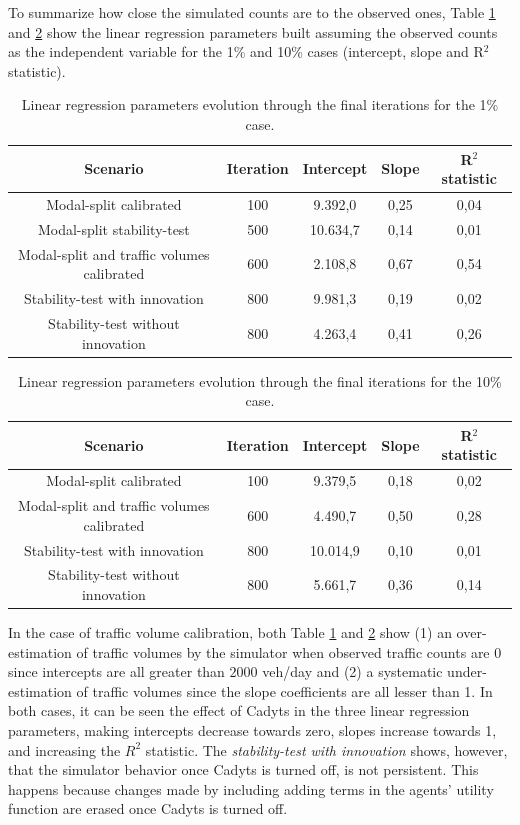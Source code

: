 \documentclass[Journal,letterpaper]{ascelike-new}
\begin{document}
To summarize how close the simulated counts are to the observed ones, Table \ref{table:1pct_fitEvolution} and \ref{table:10pct_fitEvolution} show the linear regression parameters built assuming the observed counts as the independent variable for the 1\% and 10\% cases (intercept, slope and R$^2$ statistic).

\begin{table}
	\caption{Linear regression parameters evolution through the final iterations for the 1\% case.}
	\label{table:1pct_fitEvolution}
	\begin{tabular}{ccccc}
		\hline	
		Scenario & Iteration & Intercept &  Slope & R$^{2}$ statistic \\
		\hline
		Modal-split calibrated						& 100 & 9.392,0  & 0,25 & 0,04 \\
		Modal-split stability-test					& 500 & 10.634,7 & 0,14 & 0,01 \\
		Modal-split and traffic volumes calibrated	& 600 & 2.108,8  & 0,67 & 0,54 \\
		Stability-test with innovation				& 800 & 9.981,3  & 0,19 & 0,02 \\
		Stability-test without innovation			& 800 & 4.263,4  & 0,41 & 0,26 \\
		\hline
	\end{tabular}
\end{table}

\begin{table}
	\caption{Linear regression parameters evolution through the final iterations for the 10\% case.}
	\label{table:10pct_fitEvolution}
	\begin{tabular}{ccccc}
		\hline	
		Scenario & Iteration & Intercept &  Slope & R$^{2}$ statistic \\
		\hline
		Modal-split calibrated						& 100 & 9.379,5  & 0,18 & 0,02 \\
		Modal-split and traffic volumes calibrated	& 600 & 4.490,7  & 0,50 & 0,28 \\
		Stability-test with innovation				& 800 & 10.014,9 & 0,10 & 0,01 \\
		Stability-test without innovation			& 800 & 5.661,7  & 0,36 & 0,14 \\
		\hline
	\end{tabular}
\end{table}

In the case of traffic volume calibration, both Table \ref{table:1pct_fitEvolution} and \ref{table:10pct_fitEvolution} show (1) an over-estimation of traffic volumes by the simulator when observed traffic counts are 0 since intercepts are all greater than $2000$ veh/day and (2) a systematic under-estimation of traffic volumes since the slope coefficients are all lesser than 1. In both cases, it can be seen the effect of Cadyts in the three linear regression parameters, making intercepts decrease towards zero, slopes increase towards 1, and increasing the $R^2$ statistic. The \emph{stability-test with innovation} shows, however, that the simulator behavior once Cadyts is turned off, is not persistent. This happens because changes made by including adding terms in the agents' utility function are erased once Cadyts is turned off.
\end{document}
